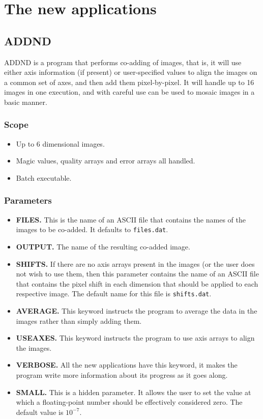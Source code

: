 \section{The new applications{}}
\label{sec:new}

\subsection{ADDND}

ADDND is a program that performs co-adding of images, that is, it will use
either axis information (if present) or user-specified values to align the
images on a common set of axes, and then add them pixel-by-pixel. It will
handle up to 16 images in one execution, and with careful use can be used to
mosaic images in a basic manner. 

\subsubsection{Scope}

\begin{itemize}
\item Up to 6 dimensional images.
\item Magic values, quality arrays and error arrays all handled.
\item Batch executable.
\end{itemize}

\subsubsection{Parameters}

\begin{itemize}
\item {\bf FILES.} This is the name of an ASCII file that contains the names of
the images to be co-added. It defaults to {\tt files.dat}.
\item {\bf OUTPUT.} The name of the resulting co-added image.
\item {\bf SHIFTS.} If there are no axis arrays present in the images (or the
user does not wish to use them, then this parameter contains the name of an
ASCII file that contains the pixel shift in each dimension that should be
applied to each respective image. The default name for this file is {\tt shifts.dat}.
\item {\bf AVERAGE.} This keyword instructs the program to average the data in
the images rather than simply adding them.
\item {\bf USEAXES.} This keyword instructs the program to use axis arrays to
align the images.
\item {\bf VERBOSE.} All the new applications have this keyword, it makes the
program write more information about its progress as it goes along.
\item {\bf SMALL.} This is a hidden parameter. It allows the user to set the
value at which a floating-point number should be effectively considered zero.
The default value is $10^{-7}$.
\end{itemize}

